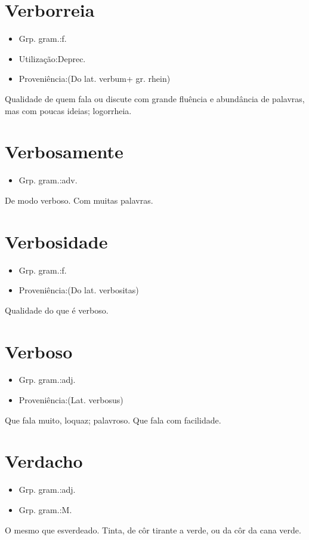 \documentclass{article}
\begin{document}
\section{Verborreia}
\begin{itemize}
\item {Grp. gram.:f.}
\end{itemize}
\begin{itemize}
\item {Utilização:Deprec.}
\end{itemize}
\begin{itemize}
\item {Proveniência:(Do lat. \textunderscore verbum\textunderscore  + gr. \textunderscore rhein\textunderscore )}
\end{itemize}
Qualidade de quem fala ou discute com grande fluência e abundância de palavras, mas com poucas ideias; logorrheia.
\section{Verbosamente}
\begin{itemize}
\item {Grp. gram.:adv.}
\end{itemize}
De modo verboso.
Com muitas palavras.
\section{Verbosidade}
\begin{itemize}
\item {Grp. gram.:f.}
\end{itemize}
\begin{itemize}
\item {Proveniência:(Do lat. \textunderscore verbositas\textunderscore )}
\end{itemize}
Qualidade do que é verboso.
\section{Verboso}
\begin{itemize}
\item {Grp. gram.:adj.}
\end{itemize}
\begin{itemize}
\item {Proveniência:(Lat. \textunderscore verbosus\textunderscore )}
\end{itemize}
Que fala muito, loquaz; palavroso.
Que fala com facilidade.
\section{Verdacho}
\begin{itemize}
\item {Grp. gram.:adj.}
\end{itemize}
\begin{itemize}
\item {Grp. gram.:M.}
\end{itemize}
O mesmo que \textunderscore esverdeado\textunderscore .
Tinta, de côr tirante a verde, ou da côr da cana verde.
\end{document}
